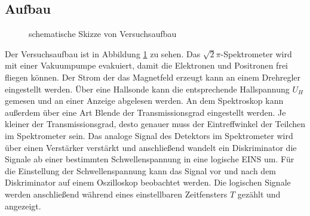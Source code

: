 \subsection{Aufbau}
\begin{figure}[h]
  \centering
  \caption{schematische Skizze von Versuchsaufbau}
  \label{fig:aufbau}
\end{figure}

Der Versuchsaufbau ist in Abbildung \ref{fig:aufbau} zu sehen. Das $\sqrt{2}\pi$-Spektrometer wird mit einer Vakuumpumpe evakuiert, damit die Elektronen und Positronen frei fliegen können. Der Strom der das Magnetfeld erzeugt kann an einem Drehregler eingestellt werden. Über eine Hallsonde kann die entsprechende Hallspannung $U_H$ gemesen und an einer Anzeige abgelesen werden. An dem Spektroskop kann außerdem über eine Art Blende der Transmissionsgrad eingestellt werden. Je kleiner der Transmissionsgrad, desto genauer muss der Eintreffwinkel der Teilchen im Spektrometer sein. Das analoge Signal des Detektors im Spektrometer wird über einen Verstärker verstärkt und anschließend wandelt ein Diskriminator die Signale ab einer bestimmten Schwellenspannung in eine logische EINS um. Für die Einstellung der Schwellenspannung kann das Signal vor und nach dem Diskriminator auf einem Oszilloskop beobachtet werden. Die logischen Signale werden anschließend während eines einstellbaren Zeitfensters $T$ gezählt und angezeigt.

